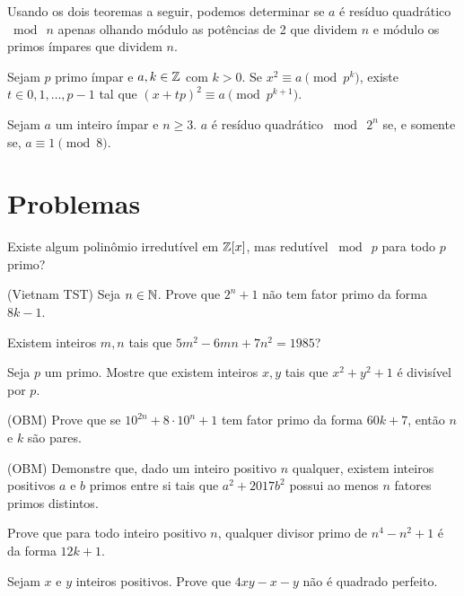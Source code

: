 \documentclass[10pt,a4paper]{article}
\newcommand{\tmod}[1]{\bmod{\ #1}}
\begin{document}
	Usando os dois teoremas a seguir, podemos determinar se $a$ é resíduo quadrático $\tmod{n}$ apenas olhando módulo as potências de 2 que dividem $n$ e módulo os primos ímpares que dividem $n$.

	\begin{thm}
		Sejam $p$ primo ímpar e $a, k \in \mathbb{Z}$ com $k > 0$. Se $x^2 \equiv a \pmod{p^k}$, existe $t \in {0, 1, \dots, p-1}$ tal que $(x+tp)^2 \equiv a \pmod{p^{k+1}}$.
	\end{thm}
	\begin{thm}
		Sejam $a$ um inteiro ímpar e $n \ge 3$. $a$ é resíduo quadrático $\tmod{2^n}$ se, e somente se, $a \equiv 1 \pmod{8}$.
	\end{thm}


	\newpage
	\section*{Problemas}
	\begin{prob}
		Existe algum polinômio irredutível em $\mathbb{Z}[x]$, mas redutível $\tmod{p}$ para todo $p$ primo?
	\end{prob}
	\begin{prob}(Vietnam TST)
		Seja $n \in \mathbb{N}$. Prove que $2^n + 1$ não tem fator primo da forma $8k - 1$.
	\end{prob}
	\begin{prob}
		Existem inteiros $m, n$ tais que $5m^2 - 6mn + 7n^2 = 1985$?
	\end{prob}
	\begin{prob}
		Seja $p$ um primo. Mostre que existem inteiros $x, y$ tais que $x^2 + y^2 + 1$ é divisível por $p$.
	\end{prob}
	\begin{prob}(OBM)
		Prove que se $10^{2n} + 8 \cdot 10^n + 1$ tem fator primo da forma $60k + 7$, então $n$ e $k$ são pares.
	\end{prob}
	\begin{prob}(OBM)
		Demonstre que, dado um inteiro positivo $n$ qualquer, existem inteiros positivos $a$ e $b$ primos entre si tais que $a^2 + 2017b^2$ possui ao menos $n$ fatores primos distintos.
	\end{prob}
	\begin{prob}
		Prove que para todo inteiro positivo $n$, qualquer divisor primo de $n^4 - n^2 + 1$ é da forma $12k + 1$.
	\end{prob}
	\begin{prob}
		Sejam $x$ e $y$ inteiros positivos. Prove que $4xy - x - y$ não é quadrado perfeito.
	\end{prob}
\end{document}
